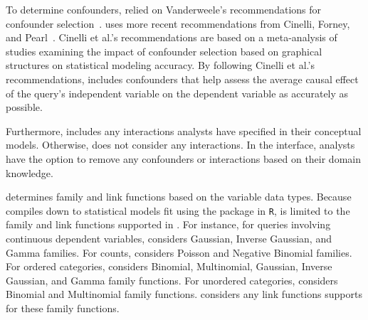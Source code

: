 To determine confounders, \tisane relied on Vanderweele's recommendations for
confounder selection~\cite{vanderweele2019modifiedDisjunctiveCriterion}.
\rTisane uses more recent recommendations from Cinelli, Forney, and
Pearl~\cite{cinelli2020controls}. Cinelli et al.'s recommendations are based on
a meta-analysis of studies examining the impact of confounder selection based on
graphical structures on statistical modeling accuracy. By following Cinelli et
al.'s recommendations, \rTisane includes confounders that help assess the
average causal effect of the query's independent variable on the dependent
variable as accurately as possible. 

Furthermore, \rTisane includes any interactions analysts have specified in their
conceptual models. Otherwise, \rTisane does not consider any interactions. In
the interface, analysts have the option to remove any confounders or
interactions based on their domain knowledge. 

\rTisane determines family and link functions based on the variable data types.
Because \rTisane compiles down to statistical models fit using the \lme package
in \texttt{R}, \rTisane is limited to the family and link functions supported in
\lme. For instance, for queries involving continuous dependent variables,
\rTisane considers Gaussian, Inverse Gaussian, and Gamma families. For counts,
\rTisane considers Poisson and Negative Binomial families. For ordered
categories, \rTisane considers Binomial, Multinomial, Gaussian, Inverse
Gaussian, and Gamma family functions. For unordered categories, \rTisane
considers Binomial and Multinomial family functions. \rTisane considers any link
functions \lme supports for these family functions. 
